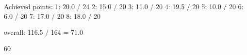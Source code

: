 Achieved points:
1: 20.0 / 24
2: 15.0 / 20
3: 11.0 / 20
4: 19.5 / 20
5: 10.0 / 20
6:  6.0 / 20
7: 17.0 / 20
8: 18.0 / 20

overall: 116.5 / 164 = 71.0%

60%
